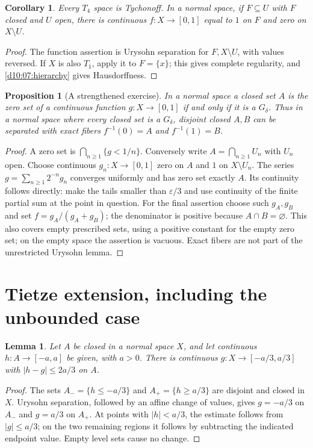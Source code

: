 \documentclass[11pt,oneside,openany]{book}
\newtheorem{lemma}[theorem]{Lemma}
\newtheorem{proposition}[theorem]{Proposition}
\newtheorem{corollary}[theorem]{Corollary}
\theoremstyle{definition}
\theoremstyle{remark}
\newcommand{\eps}{\varepsilon}
\begin{document}
\begin{corollary}\label{d10:07:t4-tychonoff}
Every $T_4$ space is Tychonoff. In a normal space, if $F\subseteq U$ with $F$ closed and $U$ open, there is continuous $f:X\to[0,1]$ equal to $1$ on $F$ and zero on $X\setminus U$.
\end{corollary}
\begin{proof}
The function assertion is Urysohn separation for $F,X\setminus U$, with values reversed. If $X$ is also $T_1$, apply it to $F=\{x\}$; this gives complete regularity, and \cref{d10:07:hierarchy} gives Hausdorffness.
\end{proof}

\begin{proposition}[A strengthened exercise]\label{d10:07:zero-sets}
In a normal space a closed set $A$ is the zero set of a continuous function $g:X\to[0,1]$ if and only if it is a $G_\delta$. Thus in a normal space where every closed set is a $G_\delta$, disjoint closed $A,B$ can be separated with exact fibers $f^{-1}(0)=A$ and $f^{-1}(1)=B$.
\end{proposition}
\begin{proof}
A zero set is $\bigcap_{n\geq1}\{g<1/n\}$. Conversely write $A=\bigcap_{n\geq1}U_n$ with $U_n$ open. Choose continuous $g_n:X\to[0,1]$ zero on $A$ and $1$ on $X\setminus U_n$. The series $g=\sum_{n\geq1}2^{-n}g_n$ converges uniformly and has zero set exactly $A$. Its continuity follows directly: make the tails smaller than $\eps/3$ and use continuity of the finite partial sum at the point in question. For the final assertion choose such $g_A,g_B$ and set $f=g_A/(g_A+g_B)$; the denominator is positive because $A\cap B=\varnothing$. This also covers empty prescribed sets, using a positive constant for the empty zero set; on the empty space the assertion is vacuous. Exact fibers are not part of the unrestricted Urysohn lemma.
\end{proof}

\section{Tietze extension, including the unbounded case}
\begin{lemma}\label{d10:07:approximate-extension}
Let $A$ be closed in a normal space $X$, and let continuous $h:A\to[-a,a]$ be given, with $a>0$. There is continuous $g:X\to[-a/3,a/3]$ with $|h-g|\leq2a/3$ on $A$.
\end{lemma}
\begin{proof}
The sets $A_- =\{h\leq-a/3\}$ and $A_+=\{h\geq a/3\}$ are disjoint and closed in $X$. Urysohn separation, followed by an affine change of values, gives $g=-a/3$ on $A_-$ and $g=a/3$ on $A_+$. At points with $|h|<a/3$, the estimate follows from $|g|\leq a/3$; on the two remaining regions it follows by subtracting the indicated endpoint value. Empty level sets cause no change.
\end{proof}
\end{document}
